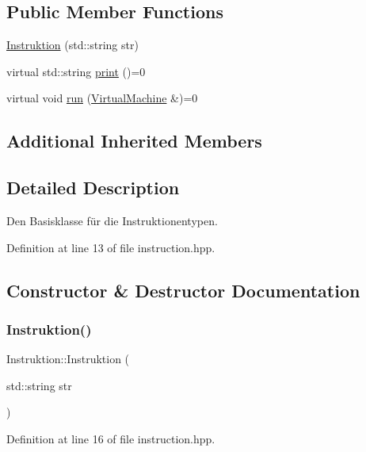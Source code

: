 \subsection*{Public Member Functions}
\begin{DoxyCompactItemize}
\item 
\mbox{\hyperlink{class_instruktion_a26d54febd2022c7402a22a8b55ba097a}{Instruktion}} (std\+::string str)
\item 
virtual std\+::string \mbox{\hyperlink{class_instruktion_a267ff36e98ec889cceccb2f464c36bc6}{print}} ()=0
\item 
virtual void \mbox{\hyperlink{class_instruktion_ad701f6b5537e5aa8c8c08b81a8946f63}{run}} (\mbox{\hyperlink{class_virtual_machine}{Virtual\+Machine}} \&)=0
\end{DoxyCompactItemize}
\subsection*{Additional Inherited Members}


\subsection{Detailed Description}
Den Basisklasse für die Instruktionentypen. 

Definition at line 13 of file instruction.\+hpp.



\subsection{Constructor \& Destructor Documentation}
\mbox{\label{class_instruktion_a26d54febd2022c7402a22a8b55ba097a}} 
\subsubsection{\texorpdfstring{Instruktion()}{Instruktion()}}
{\footnotesize\ttfamily Instruktion\+::\+Instruktion (\begin{DoxyParamCaption}\item[{std\+::string}]{str }\end{DoxyParamCaption})\hspace{0.3cm}{\ttfamily [inline]}}



Definition at line 16 of file instruction.\+hpp.


